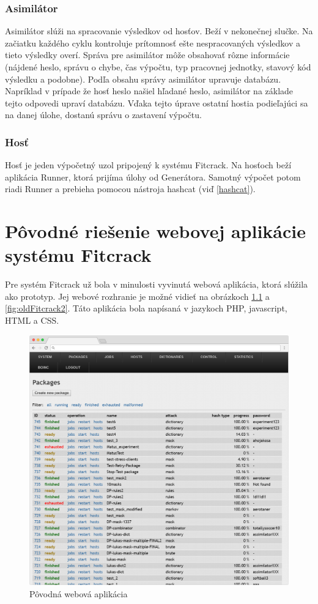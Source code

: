 \documentclass[slovak]{fitthesis}
\begin{document}
\subsection{Asimilátor}
\label{asimilator}
Asimilátor slúži na spracovanie výsledkov od hosťov. Beží v nekonečnej slučke. Na začiatku každého cyklu kontroluje prítomnosť ešte nespracovaných výsledkov a tieto výsledky overí. Správa pre asimilátor môže obsahovať rôzne informácie (nájdené heslo, správu o chybe, čas výpočtu, typ pracovnej jednotky, stavový kód výsledku a podobne). Podľa obsahu správy asimilátor upravuje databázu. Napríklad v prípade že hosť heslo našiel hľadané heslo, asimilátor na základe tejto odpovedi upraví databázu. Vďaka tejto úprave ostatní hostia podieľajúci sa na danej úlohe, dostanú správu o zastavení výpočtu.

\subsection{Hosť}
Hosť je jeden výpočetný uzol pripojený k systému Fitcrack. Na hosťoch beží aplikácia Runner, ktorá prijíma úlohy od Generátora. Samotný výpočet potom riadi Runner a prebieha pomocou nástroja hashcat (viď \ref{hashcat}).



\chapter{Pôvodné riešenie webovej aplikácie systému Fitcrack}
Pre systém Fitcrack už bola v minulosti vyvinutá webová aplikácia, ktorá slúžila ako prototyp. Jej webové rozhranie je možné vidieť na obrázkoch \ref{fig:oldFitcrack} a  \ref{fig:oldFitcrack2}. Táto aplikácia bola napísaná v jazykoch PHP, javascript, HTML a CSS.
\begin{figure}[H]
    \centering
    \includegraphics[scale=0.3]{obrazky/oldWebadminFrame.PNG}
    \caption{Pôvodná webová aplikácia}
    \label{fig:oldFitcrack}
\end{figure}
\end{document}
